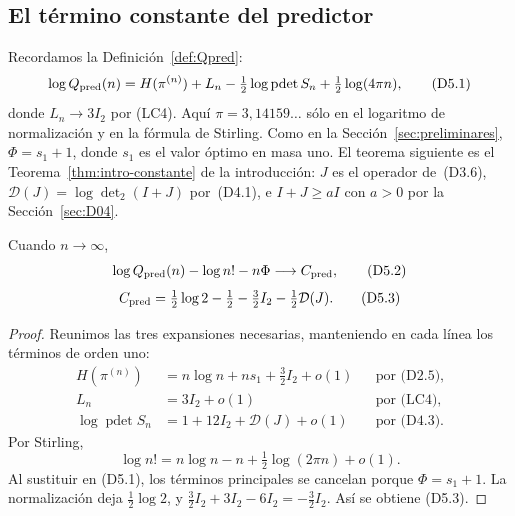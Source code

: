 \subsection{El término constante del predictor}\label{sec:D05}
Recordamos la Definición~\ref{def:Qpred}:
\[
 \log Q_{\rm pred}(n)=H(\pi^{(n)})+L_n
           -\tfrac12\log\operatorname{pdet}S_n
           +\tfrac12\log(4\pi n),                    \tag{D5.1}
\]
donde $L_n\to3I_2$ por (LC4).
Aquí $\pi=3{,}14159\ldots$ sólo en el logaritmo de normalización y en la fórmula de Stirling.
Como en la Sección~\ref{sec:preliminares}, $\Phi=s_1+1$, donde $s_1$ es el valor óptimo en
masa uno.
El teorema siguiente es el Teorema~\ref{thm:intro-constante} de la introducción: $J$ es el operador
de~(D3.6), $\mathcal D(J)=\log\det_2(I+J)$ por~(D4.1), e $I+J\ge aI$ con $a>0$ por la
Sección~\ref{sec:D04}.

\begin{teorema}\label{thm:constante}
Cuando $n\to\infty$,
\[
 \log Q_{\rm pred}(n)-\log n!-n\Phi\longrightarrow C_{\rm pred},
                                                        \tag{D5.2}
\]
\[
 C_{\rm pred}=\tfrac12\log2-\tfrac12
             -\tfrac32 I_2-\tfrac12\mathcal D(J).     \tag{D5.3}
\]
\end{teorema}
\begin{proof}
Reunimos las tres expansiones necesarias, manteniendo en cada línea los términos de orden uno:
\[
\begin{aligned}
 H(\pi^{(n)}) &= n\log n+ns_1+\tfrac32 I_2+o(1) &&\text{por (D2.5)},\\
 L_n &= 3I_2+o(1) &&\text{por (LC4)},\\
 \log\operatorname{pdet}S_n &=1+12I_2+\mathcal D(J)+o(1) &&\text{por (D4.3)}.
\end{aligned}
\]
Por Stirling,
\[
 \log n!=n\log n-n+\tfrac12\log(2\pi n)+o(1).
\]
Al sustituir en (D5.1), los términos principales se cancelan porque
$\Phi=s_1+1$. La normalización deja $\tfrac12\log2$,
y $\tfrac32I_2+3I_2-6I_2=-\tfrac32I_2$.
Así se obtiene (D5.3).
\end{proof}
